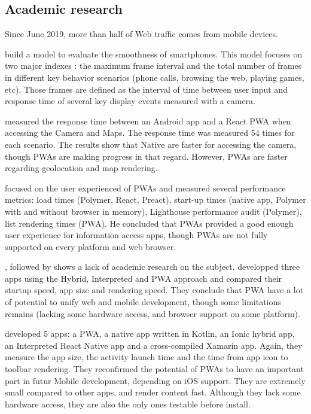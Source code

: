 \subsection{Academic research}

Since June 2019, more than half of Web traffic comes from mobile devices. \cite{WebTrafficData}

    \cite{smoothnessQoE} build a model to evaluate the smoothness of smartphones. This model focuses on two major indexes : the maximum frame interval and the total number of frames in different key behavior scenarios (phone calls, browsing the web, playing games, etc). Those frames are defined as the interval of time between user input and response time of several key display events measured with a camera. %
    
    \cite{PWAbc_responsetime} measured the response time between an Android app and a React PWA when accessing the Camera and Maps. The response time was measured 54 times for each scenario. The results show that Native are faster for accessing the camera, though PWAs are making progress in that regard. However, PWAs are faster regarding geolocation and map rendering.
    
    \cite{YbergViktor2018NPaU} focused on the user experienced of PWAs and measured several performance metrics: load times (Polymer, React, Preact), start-up times (native app, Polymer with and without browser in memory), Lighthouse performance audit (Polymer), list rendering times (PWA). He concluded that PWAs provided a good enough user experience for information access apps, though PWAs are not fully supported on every platform and web browser.
    
    \cite{PWApossibleUnifer}, followed by \cite{Biorn-Hansen2} shows a lack of academic research on the subject. \cite{PWApossibleUnifer} developped three apps using the Hybrid, Interpreted and PWA approach and compared their startup speed, app size and rendering speed. They conclude that PWA have a lot of potential to unify web and mobile development, though some limitations remains (lacking some hardware access, and browser support on some platform).
    
    \cite{Biorn-Hansen2} developed 5 apps: a PWA, a native app written in Kotlin, an Ionic hybrid app, an Interpreted React Native app and a cross-compiled Xamarin app. Again, they measure the app size, the activity launch time and the time from app icon to toolbar rendering. They reconfirmed the potential of PWAs to have an important part in futur Mobile development, depending on iOS support. They are extremely small compared to other apps, and render content fast. Although they lack some hardware access, they are also the only ones testable before install. 
    
